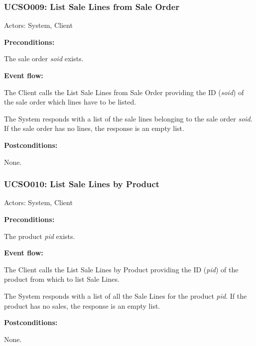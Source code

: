 \begin{ucbox}{\subsubsection{UCSO009: List Sale Lines from Sale Order}}
\label{UCSO009}

Actors: System, Client

\textbf{Preconditions:}

\ucitem The sale order \textit{soid} exists.

\textbf{Event flow:}

\ucitem The Client calls the List Sale Lines from Sale Order providing the ID (\textit{soid}) of the sale order which lines have to be listed.

\ucitem The System responds with a list of the sale lines belonging to the sale order \textit{soid}. If the sale order has no lines, the response is an empty list.

\textbf{Postconditions:}

\ucitem None.

\end{ucbox}

\begin{ucbox}{\subsubsection{UCSO010: List Sale Lines by Product}}
\label{UCSO010}

Actors: System, Client

\textbf{Preconditions:}

\ucitem The product \textit{pid} exists.

\textbf{Event flow:}

\ucitem The Client calls the List Sale Lines by Product providing the ID (\textit{pid}) of the product from which to list Sale Lines.

\ucitem The System responds with a list of all the Sale Lines for the product \textit{pid}. If the product has no sales, the response is an empty list.

\textbf{Postconditions:}

\ucitem None.

\end{ucbox}

